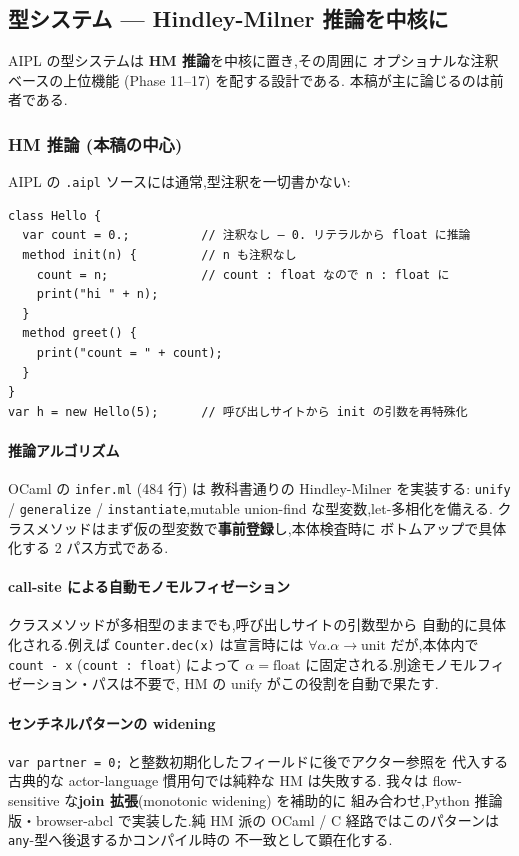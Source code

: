 \documentclass[11pt,a4paper]{article}
\newcommand{\code}[1]{\texttt{\small #1}}
\begin{document}
\subsection{型システム --- Hindley-Milner 推論を中核に}
\label{sec:types}

AIPL の型システムは \textbf{HM 推論}を中核に置き,その周囲に
オプショナルな注釈ベースの上位機能 (Phase 11--17) を配する設計である.
本稿が主に論じるのは前者である.

\subsubsection{HM 推論 (本稿の中心)}

AIPL の \code{.aipl} ソースには通常,型注釈を一切書かない:

\begin{lstlisting}
class Hello {
  var count = 0.;          // 注釈なし — 0. リテラルから float に推論
  method init(n) {         // n も注釈なし
    count = n;             // count : float なので n : float に
    print("hi " + n);
  }
  method greet() {
    print("count = " + count);
  }
}
var h = new Hello(5);      // 呼び出しサイトから init の引数を再特殊化
\end{lstlisting}

\paragraph{推論アルゴリズム} OCaml の \code{infer.ml} (484 行) は
教科書通りの Hindley-Milner を実装する: \code{unify} / \code{generalize}
/ \code{instantiate},mutable union-find な型変数,let-多相化を備える.
クラスメソッドはまず仮の型変数で\textbf{事前登録}し,本体検査時に
ボトムアップで具体化する 2 パス方式である.

\paragraph{call-site による自動モノモルフィゼーション}
クラスメソッドが多相型のままでも,呼び出しサイトの引数型から
自動的に具体化される.例えば \code{Counter.dec(x)} は宣言時には
$\forall \alpha. \alpha \to \text{unit}$ だが,本体内で
\code{count - x} (\code{count : float}) によって $\alpha = \text{float}$
に固定される.別途モノモルフィゼーション・パスは不要で,
HM の unify がこの役割を自動で果たす.

\paragraph{センチネルパターンの widening}
\code{var partner = 0;} と整数初期化したフィールドに後でアクター参照を
代入する古典的な actor-language 慣用句では純粋な HM は失敗する.
我々は flow-sensitive な\textbf{join 拡張}(monotonic widening) を補助的に
組み合わせ,Python 推論版・browser-abcl で実装した.純 HM 派の OCaml /
C 経路ではこのパターンは \code{any}-型へ後退するかコンパイル時の
不一致として顕在化する.
\end{document}

